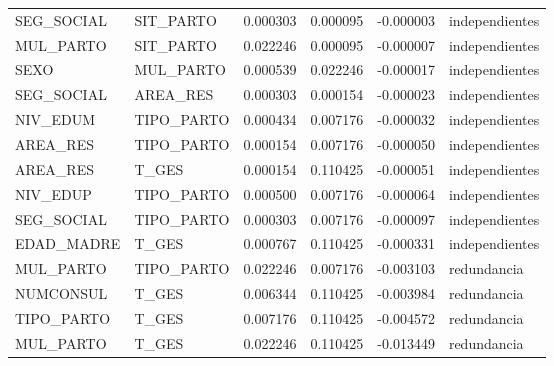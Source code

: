 \begin{tabular}{llrrrl}
SEG\_SOCIAL & SIT\_PARTO & 0.000303 & 0.000095 & -0.000003 & independientes \\
MUL\_PARTO & SIT\_PARTO & 0.022246 & 0.000095 & -0.000007 & independientes \\
SEXO & MUL\_PARTO & 0.000539 & 0.022246 & -0.000017 & independientes \\
SEG\_SOCIAL & AREA\_RES & 0.000303 & 0.000154 & -0.000023 & independientes \\
NIV\_EDUM & TIPO\_PARTO & 0.000434 & 0.007176 & -0.000032 & independientes \\
AREA\_RES & TIPO\_PARTO & 0.000154 & 0.007176 & -0.000050 & independientes \\
AREA\_RES & T\_GES & 0.000154 & 0.110425 & -0.000051 & independientes \\
NIV\_EDUP & TIPO\_PARTO & 0.000500 & 0.007176 & -0.000064 & independientes \\
SEG\_SOCIAL & TIPO\_PARTO & 0.000303 & 0.007176 & -0.000097 & independientes \\
EDAD\_MADRE & T\_GES & 0.000767 & 0.110425 & -0.000331 & independientes \\
MUL\_PARTO & TIPO\_PARTO & 0.022246 & 0.007176 & -0.003103 & redundancia \\
NUMCONSUL & T\_GES & 0.006344 & 0.110425 & -0.003984 & redundancia \\
TIPO\_PARTO & T\_GES & 0.007176 & 0.110425 & -0.004572 & redundancia \\
MUL\_PARTO & T\_GES & 0.022246 & 0.110425 & -0.013449 & redundancia \\
\bottomrule
\end{tabular}
